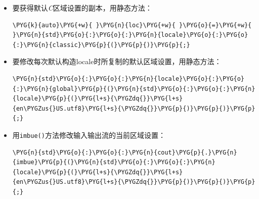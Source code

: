 \begin{itemize}
\begin{itemize}

\item 要获得默认\textit{C}区域设置的副本，用静态方法：



\begin{codeblockbg}
\begin{Verbatim}[commandchars=\\\{\},breaklines=true,breakanywhere=true,fontsize=\codefont,xleftmargin=17bp]
\PYG{k}{auto}\PYG{+w}{ }\PYG{n}{loc}\PYG{+w}{ }\PYG{o}{=}\PYG{+w}{ }\PYG{n}{std}\PYG{o}{:}\PYG{o}{:}\PYG{n}{locale}\PYG{o}{:}\PYG{o}{:}\PYG{n}{classic}\PYG{p}{(}\PYG{p}{)}\PYG{p}{;}
\end{Verbatim}
\end{codeblockbg}



\item 要修改每次默认构造locale时所复制的默认区域设置，用静态方法：



\begin{codeblockbg}
\begin{Verbatim}[commandchars=\\\{\},breaklines=true,breakanywhere=true,fontsize=\codefont,xleftmargin=17bp]
\PYG{n}{std}\PYG{o}{:}\PYG{o}{:}\PYG{n}{locale}\PYG{o}{:}\PYG{o}{:}\PYG{n}{global}\PYG{p}{(}\PYG{n}{std}\PYG{o}{:}\PYG{o}{:}\PYG{n}{locale}\PYG{p}{(}\PYG{l+s}{\PYGZdq{}}\PYG{l+s}{en\PYGZus{}US.utf8}\PYG{l+s}{\PYGZdq{}}\PYG{p}{)}\PYG{p}{)}\PYG{p}{;}
\end{Verbatim}
\end{codeblockbg}



\item 用\texttt{imbue()}方法修改输入输出流的当前区域设置：



\begin{codeblockbg}
\begin{Verbatim}[commandchars=\\\{\},breaklines=true,breakanywhere=true,fontsize=\codefont,xleftmargin=17bp]
\PYG{n}{std}\PYG{o}{:}\PYG{o}{:}\PYG{n}{cout}\PYG{p}{.}\PYG{n}{imbue}\PYG{p}{(}\PYG{n}{std}\PYG{o}{:}\PYG{o}{:}\PYG{n}{locale}\PYG{p}{(}\PYG{l+s}{\PYGZdq{}}\PYG{l+s}{en\PYGZus{}US.utf8}\PYG{l+s}{\PYGZdq{}}\PYG{p}{)}\PYG{p}{)}\PYG{p}{;}
\end{Verbatim}
\end{codeblockbg}

\end{itemize}

\end{itemize}


